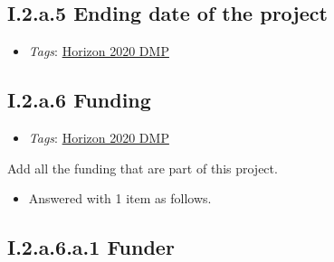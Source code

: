 \documentclass[a4paper,12pt]{report}
\begin{document}
\subsection*{\protect\textcolor{colorSecId}{I.2.a.5} Ending date of the project}

\label{1e85da40-bbfc-4180-903e-6c569ed2da38.c3dabaaf-c946-4a0d-889c-ede966f97667.01fb6972-a748-47d6-9974-6cfa59b4b156.cabc6f07-6015-454e-b97a-c34db4ec0c60}


\begin{itemize}
  \item \textit{Tags}: \ul{Horizon 2020 DMP}
  \end{itemize}





\subsection*{\protect\textcolor{colorSecId}{I.2.a.6} Funding}

\label{1e85da40-bbfc-4180-903e-6c569ed2da38.c3dabaaf-c946-4a0d-889c-ede966f97667.01fb6972-a748-47d6-9974-6cfa59b4b156.36a87eac-402d-43fb-a0df-ac5963bdf87d}


\begin{itemize}
  \item \textit{Tags}: \ul{Horizon 2020 DMP}
  \end{itemize}


\noindent
\begin{markdown}
Add all the funding that are part of this project.
\end{markdown}


\begin{itemize}
  \item[\ArrowBoldDownRight] Answered with 1 item as follows.
\end{itemize}%
\subsection*{\protect\textcolor{colorSecId}{I.2.a.6.a.1} Funder}
\end{document}
